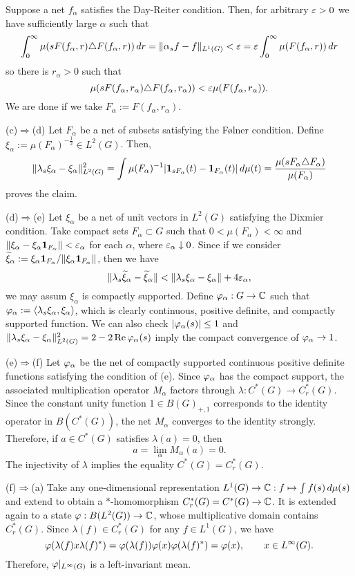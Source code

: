 \documentclass{../../small}
\begin{document}
\begin{pf}
Suppose a net $f_\alpha$ satisfies the Day-Reiter condition.
Then, for arbitrary $\varepsilon>0$ we have sufficiently large $\alpha$ such that
\[\int_0^\infty\mu(sF(f_\alpha,r)\triangle F(f_\alpha,r))\,dr=\|\alpha_sf-f\|_{L^1(G)}<\varepsilon=\varepsilon\int_0^\infty\mu(F(f_\alpha,r))\,dr\]
so there is $r_\alpha>0$ such that
\[\mu(sF(f_\alpha,r_\alpha)\triangle F(f_\alpha,r_\alpha))<\varepsilon\mu(F(f_\alpha,r_\alpha)).\]
We are done if we take $F_\alpha:=F(f_\alpha,r_\alpha)$.

(c)$\Rightarrow$(d)
Let $F_\alpha$ be a net of subsets satisfying the F\o lner condition.
Define $\xi_\alpha:=\mu(F_\alpha)^{-\frac12}\in L^2(G)$.
Then,
\[\|\lambda_s\xi_\alpha-\xi_\alpha\|_{L^2(G)}^2=\int\mu(F_\alpha)^{-1}|\mathbf{1}_{sF_\alpha}(t)-\mathbf{1}_{F_\alpha}(t)|\,d\mu(t)=\frac{\mu(sF_\alpha\triangle F_\alpha)}{\mu(F_\alpha)}\]
proves the claim.

(d)$\Rightarrow$(e)
Let $\xi_\alpha$ be a net of unit vectors in $L^2(G)$ satisfying the Dixmier condition.
Take compact sets $F_\alpha\subset G$ such that $0<\mu(F_\alpha)<\infty$ and $\|\xi_\alpha-\xi_\alpha\mathbf{1}_{F_\alpha}\|<\varepsilon_\alpha$ for each $\alpha$, where $\varepsilon_\alpha\downarrow0$.
Since if we consider $\widetilde\xi_\alpha:=\xi_\alpha\mathbf{1}_{F_\alpha}/\|\xi_\alpha\mathbf{1}_{F_\alpha}\|$, then we have
\[\|\lambda_s\widetilde\xi_\alpha-\widetilde\xi_\alpha\|<\|\lambda_s\xi_\alpha-\xi_\alpha\|+4\varepsilon_\alpha,\]
we may assum $\xi_\alpha$ is compactly supported.
Define $\varphi_\alpha:G\to\mathbb{C}$ such that $\varphi_\alpha:=\langle\lambda_s\xi_\alpha,\xi_\alpha\rangle$, which is clearly continuous, positive definite, and compactly supported function.
We can also check $|\varphi_\alpha(s)|\le1$ and $\|\lambda_s\xi_\alpha-\xi_\alpha\|_{L^2(G)}^2=2-2\operatorname{Re}\varphi_\alpha(s)$ imply the compact convergence of $\varphi_\alpha\to1$.

(e)$\Rightarrow$(f)
Let $\varphi_\alpha$ be the net of compactly supported continuous positive definite functions satisfying the condition of (e).
Since $\varphi_\alpha$ has the compact support, the associated multiplication operator $M_\alpha$ factors through $\lambda:C^*(G)\to C_r^*(G)$.
Since the constant unity function $1\in B(G)_{+,1}$ corresponds to the identity operator in $B(C^*(G))$, the net $M_\alpha$ converges to the identity strongly.
Therefore, if $a\in C^*(G)$ satisfies $\lambda(a)=0$, then
\[a=\lim_\alpha M_\alpha(a)=0.\]
The injectivity of $\lambda$ implies the equality $C^*(G)=C_r^*(G)$.

(f)$\Rightarrow$(a)
Take any one-dimensional representation $L^1(G)\to\mathbb{C}:f\mapsto\int f(s)\,d\mu(s)$ and extend to obtain a $*$-homomorphism $C_r^*(G)=C^*(G)\to\mathbb{C}$.
It is extended again to a state $\varphi:B(L^2(G))\to\mathbb{C}$, whose multiplicative domain contains $C_r^*(G)$.
Since $\lambda(f)\in C_r^*(G)$ for any $f\in L^1(G)$, we have
\[\varphi(\lambda(f)x\lambda(f)^*)=\varphi(\lambda(f))\varphi(x)\varphi(\lambda(f)^*)=\varphi(x),\qquad x\in L^\infty(G).\]
Therefore, $\varphi|_{L^\infty(G)}$ is a left-invariant mean.
\end{pf}
\end{document}
